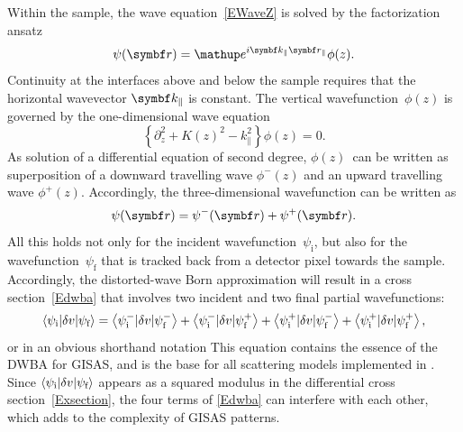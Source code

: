 Within the sample, the wave equation~\cref{EWaveZ}
is solved by the factorization ansatz
\begin{equation}\label{Ekpar}
\psi(\r) = \e^{i \k_\parallel\r_\parallel} \phi(z).
\end{equation}
%
Continuity at the interfaces above and below the sample
requires that the horizontal wavevector $\k_\parallel$ is constant.
The vertical wavefunction~$\phi(z)$
is governed by the one-dimensional wave equation
\begin{equation}\label{Ewavez}
\left\{\partial_z^2 + K(z)^2 - k_\parallel^2 \right\} \phi(z) = 0.
\end{equation}
As solution of a differential equation of second degree,
$\phi(z)$~can be written as superposition
of a downward travelling wave $\phi^-(z)$
and an upward travelling wave $\phi^+(z)$.
Accordingly, the three-dimensional wavefunction can be written as
\begin{equation}
  \psi(\r) = \psi^-(\r)+\psi^+(\r).
\end{equation}
%
%
All this holds not only for the incident wavefunction~$\psi_\text{i}$,
but also for the wavefunction~$\psi_\text{f}$
that is tracked back from a detector pixel towards the sample.
%
%
%
Accordingly,
the distorted-wave Born approximation will result in a cross section~\cref{Edwba}
that involves two incident and two final partial wavefunctions:
\begin{equation}\label{Edwba4}
  \left\langle \psi_{\text{i}}|\delta v|\psi_{\text{f}}\right\rangle
  = \left\langle \psi^-_{\text{i}}|\delta v|\psi^-_{\text{f}}\right\rangle
  + \left\langle \psi^-_{\text{i}}|\delta v|\psi^+_{\text{f}}\right\rangle
  + \left\langle \psi^+_{\text{i}}|\delta v|\psi^-_{\text{f}}\right\rangle
  + \left\langle \psi^+_{\text{i}}|\delta v|\psi^+_{\text{f}}\right\rangle,
\end{equation}
or in an obvious shorthand notation
This equation contains the essence of
the DWBA for GISAS,
and is the base for all scattering models implemented in \BornAgain.
Since $\left\langle \psi_{\text{i}}|\delta v|\psi_{\text{f}}\right\rangle$
appears as a squared modulus
in the differential cross section~\cref{Exsection},
the four terms of \cref{Edwba} can interfere with each other,
which adds to the complexity of GISAS patterns.

